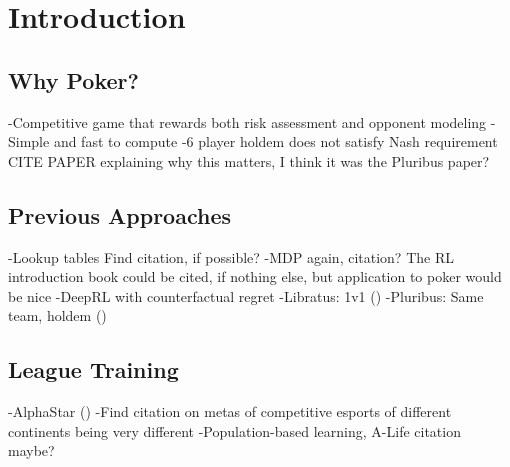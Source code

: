 \chapter{Introduction}
\section{Why Poker?}
-Competitive game that rewards both risk assessment and opponent modeling
-Simple and fast to compute
-6 player holdem does not satisfy Nash requirement {CITE PAPER explaining why this matters, I think it was the Pluribus paper?}
\section{Previous Approaches}
-Lookup tables {Find citation, if possible?}
-MDP {again, citation? The RL introduction book could be cited, if nothing else, but application to poker would be nice}
-DeepRL with counterfactual regret
    -Libratus: 1v1 (\cite{Libratus})
    -Pluribus: Same team, holdem (\cite{Pluribus})
\section{League Training}
-AlphaStar (\cite{AlphaStar})
-{Find citation on metas of competitive esports of different continents being very different}
-Population-based learning, A-Life citation maybe?